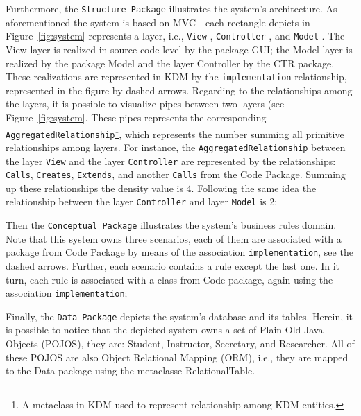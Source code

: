 Furthermore, the \texttt{Structure Package} illustrates the system's architecture. As aforementioned the system is based on MVC - each rectangle depicts in Figure~\ref{fig:system} represents a layer, i.e., \texttt{View} , \texttt{Controller} , and \texttt{Model} . %
The View layer is realized in source-code level by the package GUI; the Model layer is realized by the package Model and the layer Controller by the CTR package. These realizations are represented in KDM by the \texttt{implementation} relationship, represented in the figure by dashed arrows. Regarding to the relationships among the layers, it is possible to visualize pipes between two layers (see Figure~\ref{fig:system}. These pipes represents the corresponding \texttt{AggregatedRelationship}\footnote{A metaclass in KDM used to represent relationship among KDM entities.}, which represents the number summing all primitive relationships among layers. For instance, the \texttt{AggregatedRelationship} between the layer \texttt{View} and the layer \texttt{Controller} are represented by the relationships: \texttt{Calls}, \texttt{Creates}, \texttt{Extends}, and another \texttt{Calls} from the Code Package. Summing up these relationships the density value is 4. Following the same idea the relationship between the layer \texttt{Controller} and layer \texttt{Model} is 2;  
  
Then the \texttt{Conceptual Package} illustrates the system's business rules domain. Note that this system owns three scenarios, each of them are associated with a package from Code Package by means of the association \texttt{implementation}, see the dashed arrows. Further, each scenario contains a rule except the last one. In it turn, each rule is associated with a class from Code package, again using the association \texttt{implementation};

Finally, the \texttt{Data Package} depicts the system's database and its tables. Herein, it is possible to notice that the depicted system owns a set of Plain Old Java Objects (POJOS), they are: Student, Instructor, Secretary, and Researcher. All of these POJOS are also Object Relational Mapping (ORM), i.e., they are mapped to the Data package using the metaclasse RelationalTable. 

